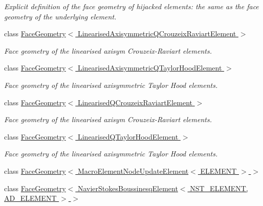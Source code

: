 \begin{DoxyCompactItemize}
\begin{DoxyCompactList}\small\item\em Explicit definition of the face geometry of hijacked elements\+: the same as the face geometry of the underlying element. \end{DoxyCompactList}\item 
class \hyperlink{classoomph_1_1FaceGeometry_3_01LinearisedAxisymmetricQCrouzeixRaviartElement_01_4}{Face\+Geometry$<$ Linearised\+Axisymmetric\+Q\+Crouzeix\+Raviart\+Element $>$}
\begin{DoxyCompactList}\small\item\em Face geometry of the linearised axisym Crouzeix-\/\+Raviart elements. \end{DoxyCompactList}\item 
class \hyperlink{classoomph_1_1FaceGeometry_3_01LinearisedAxisymmetricQTaylorHoodElement_01_4}{Face\+Geometry$<$ Linearised\+Axisymmetric\+Q\+Taylor\+Hood\+Element $>$}
\begin{DoxyCompactList}\small\item\em Face geometry of the linearised axisymmetric Taylor Hood elements. \end{DoxyCompactList}\item 
class \hyperlink{classoomph_1_1FaceGeometry_3_01LinearisedQCrouzeixRaviartElement_01_4}{Face\+Geometry$<$ Linearised\+Q\+Crouzeix\+Raviart\+Element $>$}
\begin{DoxyCompactList}\small\item\em Face geometry of the linearised axisym Crouzeix-\/\+Raviart elements. \end{DoxyCompactList}\item 
class \hyperlink{classoomph_1_1FaceGeometry_3_01LinearisedQTaylorHoodElement_01_4}{Face\+Geometry$<$ Linearised\+Q\+Taylor\+Hood\+Element $>$}
\begin{DoxyCompactList}\small\item\em Face geometry of the linearised axisymmetric Taylor Hood elements. \end{DoxyCompactList}\item 
class \hyperlink{classoomph_1_1FaceGeometry_3_01MacroElementNodeUpdateElement_3_01ELEMENT_01_4_01_4}{Face\+Geometry$<$ Macro\+Element\+Node\+Update\+Element$<$ E\+L\+E\+M\+E\+N\+T $>$ $>$}
\item 
class \hyperlink{classoomph_1_1FaceGeometry_3_01NavierStokesBoussinesqElement_3_01NST__ELEMENT_00_01AD__ELEMENT_01_4_01_4}{Face\+Geometry$<$ Navier\+Stokes\+Boussinesq\+Element$<$ N\+S\+T\+\_\+\+E\+L\+E\+M\+E\+N\+T, A\+D\+\_\+\+E\+L\+E\+M\+E\+N\+T $>$ $>$}

\end{DoxyCompactItemize}
